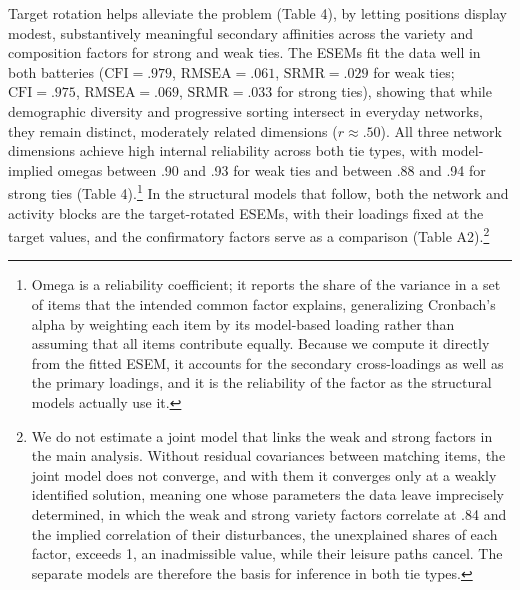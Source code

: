 \documentclass[
  12pt
]{article}
\begin{document}
Target rotation helps alleviate the problem (Table 4), by letting positions display modest, substantively meaningful secondary affinities across the variety and composition factors for strong and weak ties. The ESEMs fit the data well in both batteries ($\text{CFI} = .979$, $\text{RMSEA} = .061$, $\text{SRMR} = .029$ for weak ties; $\text{CFI} = .975$, $\text{RMSEA} = .069$, $\text{SRMR} = .033$ for strong ties), showing that while demographic diversity and progressive sorting intersect in everyday networks, they remain distinct, moderately related dimensions ($r \approx .50$). All three network dimensions achieve high internal reliability across both tie types, with model-implied omegas between .90 and .93 for weak ties and between .88 and .94 for strong ties (Table 4).\footnote{Omega is a reliability coefficient; it reports the share of the variance in a set of items that the intended common factor explains, generalizing Cronbach's alpha by weighting each item by its model-based loading rather than assuming that all items contribute equally. Because we compute it directly from the fitted ESEM, it accounts for the secondary cross-loadings as well as the primary loadings, and it is the reliability of the factor as the structural models actually use it.} In the structural models that follow, both the network and activity blocks are the target-rotated ESEMs, with their loadings fixed at the target values, and the confirmatory factors serve as a comparison (Table A2).\footnote{We do not estimate a joint model that links the weak and strong factors in the main analysis. Without residual covariances between matching items, the joint model does not converge, and with them it converges only at a weakly identified solution, meaning one whose parameters the data leave imprecisely determined, in which the weak and strong variety factors correlate at .84 and the implied correlation of their disturbances, the unexplained shares of each factor, exceeds 1, an inadmissible value, while their leisure paths cancel. The separate models are therefore the basis for inference in both tie types.}
\end{document}
